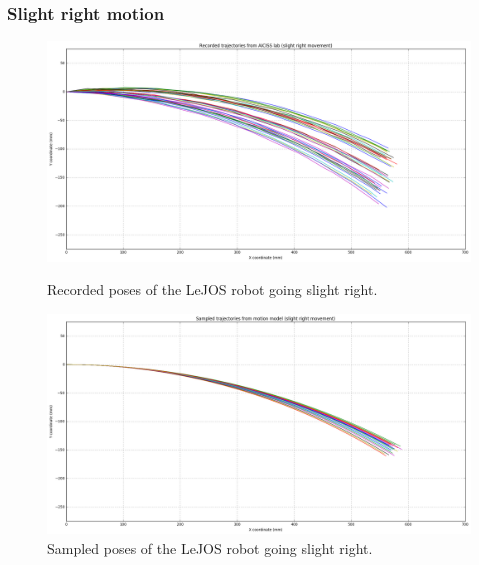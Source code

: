 \documentclass[paper=a4, fontsize=11pt]{scrartcl} %
\begin{document}
    \subsubsection*{Slight right motion}
    \begin{figure}[H]
        \centering
        \begin{minipage}{\textwidth}
            \centering
            \includegraphics[width=1\textwidth]{images/recorded_poses_slight_right.png} %
            \caption{Recorded poses of the LeJOS robot going slight right.}
        \end{minipage}\hfill
        \begin{minipage}{\textwidth}
            \centering
            \includegraphics[width=1\textwidth]{images/sampled_poses_slightRight.png} %
            \caption{Sampled poses of the LeJOS robot going slight right.}
        \end{minipage}
    \end{figure}
\end{document}
